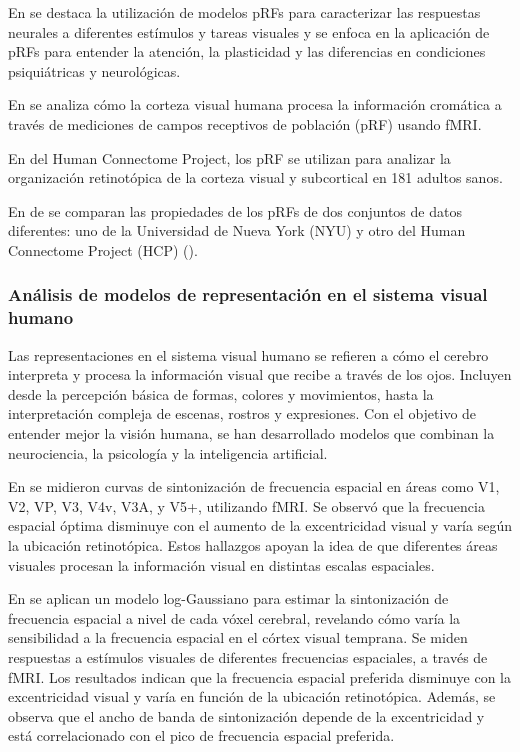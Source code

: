 En \cite{wandell_computational_2015} se destaca la utilizaci\'on de modelos pRFs para caracterizar las respuestas neurales a diferentes est\'imulos y tareas visuales y se enfoca en la aplicación de pRFs para entender la atención, la plasticidad y las diferencias en condiciones psiquiátricas y neurológicas.

En \cite{welbourne_population_2018} se analiza cómo la corteza visual humana procesa la información cromática a través de mediciones de campos receptivos de población (pRF) usando fMRI. 

En \cite{benson_human_2018} del Human Connectome Project, los pRF se utilizan para analizar la organización retinotópica de la corteza visual y subcortical en 181 adultos sanos. 

En de \cite{himmelberg_cross-dataset_2021} se comparan las propiedades de los pRFs de dos conjuntos de datos diferentes: uno de la Universidad de Nueva York (NYU) y otro del Human Connectome Project (HCP) (\cite{benson_human_2018}).  





\subsubsection*{An\'alisis de modelos de representaci\'on en el sistema visual humano}

Las representaciones en el sistema visual humano se refieren a cómo el cerebro interpreta y procesa la información visual que recibe a través de los ojos. Incluyen desde la percepción básica de formas, colores y movimientos, hasta la interpretación compleja de escenas, rostros y expresiones. Con el objetivo de entender mejor la visi\'on humana, se han desarrollado modelos que combinan la neurociencia, la psicología y la inteligencia artificial.

En \cite{henriksson_spatial_2008}  se midieron curvas de sintonización de frecuencia espacial en áreas como V1, V2, VP, V3, V4v, V3A, y V5+, utilizando fMRI. Se observ\'o que la frecuencia espacial óptima disminuye con el aumento de la excentricidad visual y varía según la ubicación retinotópica. Estos hallazgos apoyan la idea de que diferentes áreas visuales procesan la información visual en distintas escalas espaciales.

En \cite{aghajari_population_2020} se aplican un modelo log-Gaussiano para estimar la sintonización de frecuencia espacial a nivel de cada vóxel cerebral, revelando cómo varía la sensibilidad a la frecuencia espacial en el córtex visual temprana. Se miden respuestas a estímulos visuales de diferentes frecuencias espaciales, a trav\'es de fMRI. Los resultados indican que la frecuencia espacial preferida disminuye con la excentricidad visual y varía en función de la ubicación retinotópica. Además, se observa que el ancho de banda de sintonización depende de la excentricidad y está correlacionado con el pico de frecuencia espacial preferida.

